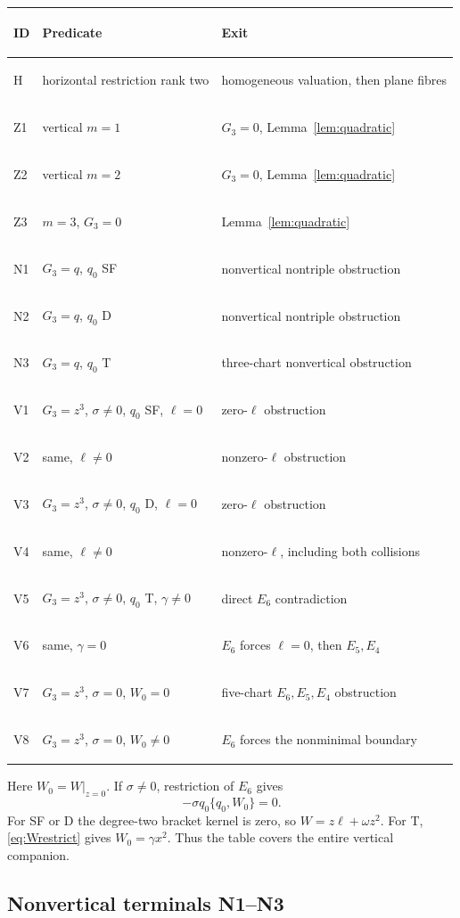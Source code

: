 \documentclass[11pt]{article}
\theoremstyle{remark}
\begin{document}
\begin{longtable}{@{}>{\bfseries\raggedright\arraybackslash}p{}
                         >{\raggedright\arraybackslash}p{}
                         >{\raggedright\arraybackslash}p{}@{}}
\toprule
ID & Predicate & Exit\\
\midrule
\endhead
H  & horizontal restriction rank two & homogeneous valuation, then plane
fibres\\
Z1 & vertical $m=1$ & $G_3=0$, Lemma~\ref{lem:quadratic}\\
Z2 & vertical $m=2$ & $G_3=0$, Lemma~\ref{lem:quadratic}\\
Z3 & $m=3$, $G_3=0$ & Lemma~\ref{lem:quadratic}\\
N1 & $G_3=q$, $q_0$ SF & nonvertical nontriple obstruction\\
N2 & $G_3=q$, $q_0$ D & nonvertical nontriple obstruction\\
N3 & $G_3=q$, $q_0$ T & three-chart nonvertical obstruction\\
V1 & $G_3=z^3$, $\sigma\ne0$, $q_0$ SF, $\ell=0$ &
zero-$\ell$ obstruction\\
V2 & same, $\ell\ne0$ & nonzero-$\ell$ obstruction\\
V3 & $G_3=z^3$, $\sigma\ne0$, $q_0$ D, $\ell=0$ &
zero-$\ell$ obstruction\\
V4 & same, $\ell\ne0$ & nonzero-$\ell$, including both collisions\\
V5 & $G_3=z^3$, $\sigma\ne0$, $q_0$ T, $\gamma\ne0$ &
direct $E_6$ contradiction\\
V6 & same, $\gamma=0$ & $E_6$ forces $\ell=0$, then $E_5,E_4$\\
V7 & $G_3=z^3$, $\sigma=0$, $W_0=0$ &
five-chart $E_6,E_5,E_4$ obstruction\\
V8 & $G_3=z^3$, $\sigma=0$, $W_0\ne0$ &
$E_6$ forces the nonminimal boundary\\
\bottomrule
\end{longtable}

Here $W_0=W|_{z=0}$.  If $\sigma\ne0$, restriction of $E_6$ gives
\begin{equation}
 -\sigma q_0\{q_0,W_0\}=0.                            \label{eq:Wrestrict}
\end{equation}
For SF or D the degree-two bracket kernel is zero, so
$W=z\ell+\omega z^2$.  For T, \eqref{eq:Wrestrict} gives
$W_0=\gamma x^2$.  Thus the table covers the entire vertical companion.

\subsection{Nonvertical terminals N1--N3}
\end{document}
